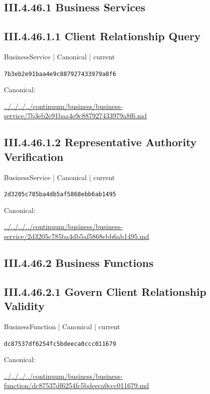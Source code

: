\documentclass[10pt,a4paper]{article}
\begin{document}
\subsection*{III.4.46.1 Business Services}
\subsection*{III.4.46.1.1 Client Relationship Query}
{\small BusinessService | Canonical | current}\par
\texttt{7b3eb2e91baa4e9c887927433979a8f6}\par
Canonical: \par
{\footnotesize\url{../../../../continuum/business/business-service/7b3eb2e91baa4e9c887927433979a8f6.md}}\par
\subsection*{III.4.46.1.2 Representative Authority Verification}
{\small BusinessService | Canonical | current}\par
\texttt{2d3205c785ba4db5af5868ebb6ab1495}\par
Canonical: \par
{\footnotesize\url{../../../../continuum/business/business-service/2d3205c785ba4db5af5868ebb6ab1495.md}}\par
\subsection*{III.4.46.2 Business Functions}
\subsection*{III.4.46.2.1 Govern Client Relationship Validity}
{\small BusinessFunction | Canonical | current}\par
\texttt{dc87537df6254fc5bdeeca0ccc011679}\par
Canonical: \par
{\footnotesize\url{../../../../continuum/business/business-function/dc87537df6254fc5bdeeca0ccc011679.md}}\par
\end{document}
